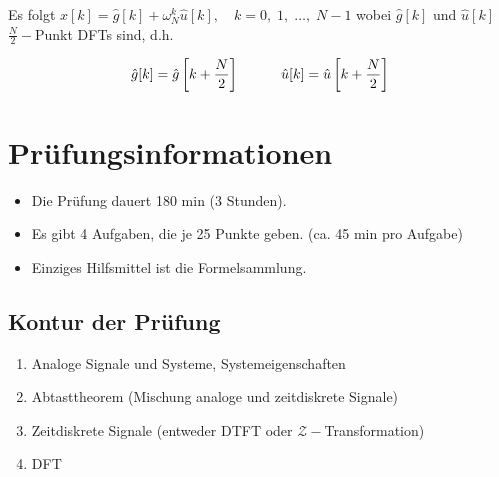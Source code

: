 \documentclass[11pt]{article}
\begin{document}
Es folgt $\hat{x}[k] = \hat{g}[k] + \omega_N^k \hat{u}[k], \hspace{12pt} k = 0, \; 1, \; \dots, \; N-1$ wobei $\hat{g}[k]$ und $\hat{u}[k]$ $\frac{N}{2}-$Punkt DFTs sind, d.h.

$$\hat{g}[k] = \hat{g}\left[k + \frac{N}{2}\right] \hspace*{30pt} \hat{u}[k] = \hat{u}\left[k + \frac{N}{2}\right]$$


\vfill \null
\pagebreak


\pagebreak

\section*{Prüfungsinformationen}
\vspace*{-0.5cm}
\begin{itemize}
    \item Die Prüfung dauert 180 min (3 Stunden).
    \item Es gibt 4 Aufgaben, die je 25 Punkte geben. (ca. 45 min pro Aufgabe)
    \item Einziges Hilfsmittel ist die Formelsammlung.
\end{itemize}

\subsection*{Kontur der Prüfung}
\vspace*{-0.5cm}
\begin{enumerate}
    \item Analoge Signale und Systeme, Systemeigenschaften
    \item Abtasttheorem (Mischung analoge und zeitdiskrete Signale)
    \item Zeitdiskrete Signale (entweder DTFT oder $\mathcal{Z}-$Transformation)
    \item DFT
\end{enumerate}
\end{document}
